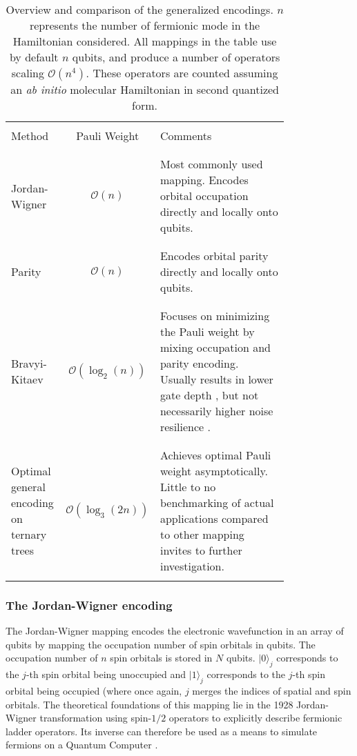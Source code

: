 \begin{table} [ht]
\caption{Overview and comparison of the generalized encodings. $n$ represents the number of fermionic mode in the Hamiltonian considered. All mappings in the table use by default $n$ qubits, and produce a number of operators scaling $\mathcal{O}(n^4)$. These operators are counted assuming an \textit{ab initio} molecular Hamiltonian in second quantized form.}
\begin{tabularx}{\textwidth}{p{0.20\linewidth}|cp{0.6\linewidth}}
\toprule
\\  Method &  Pauli Weight & Comments \\\\
\midrule\\
    Jordan-Wigner \cite{Jordan1928} & $\mathcal{O}(n)$ & Most commonly used mapping. Encodes orbital occupation directly and locally onto qubits.  \\\\
\hline\\
    Parity \cite{Seeley2012} & $\mathcal{O}(n)$ &  Encodes orbital parity directly and locally onto qubits.  \\\\
\hline\\
    Bravyi-Kitaev \cite{Bravyi2002, Seeley2012} & $\mathcal{O}(\log_2(n))$ & Focuses on minimizing the Pauli weight by mixing occupation and parity encoding. Usually results in lower gate depth \cite{Tranter2015, Tranter2018, Setia2018}, but not necessarily higher noise resilience \cite{Sawaya2016}. \\\\
\hline\\
    Optimal general encoding on ternary trees \cite{Jiang2020} & $\mathcal{O}(\log_3(2n))$ & Achieves optimal Pauli weight asymptotically. Little to no benchmarking of actual applications compared to other mapping invites to further investigation. \\\\
\bottomrule
\end{tabularx}
 \label{tab:generalized_encodings}
\end{table}

\subsubsection{The Jordan-Wigner encoding} \label{sec:jordanwigner}

The Jordan-Wigner mapping encodes the electronic wavefunction in an array of qubits by mapping the occupation number of spin orbitals in qubits. The occupation number of $n$ spin orbitals is stored in $N$ qubits. $|0\rangle_{j}$ corresponds to the $j$-th spin orbital being unoccupied and $|1\rangle_{j}$ corresponds to the $j$-th spin orbital being occupied (where once again, $j$ merges the indices of spatial and spin orbitals. The theoretical foundations of this mapping lie in the 1928 Jordan-Wigner transformation \cite{Jordan1928} using spin-$1/2$ operators to explicitly describe fermionic ladder operators. Its inverse can therefore be used as a means to simulate fermions on a Quantum Computer \cite{Ortiz2001, Somma2002, Somma2003, AspuruGuzik2005}. 

